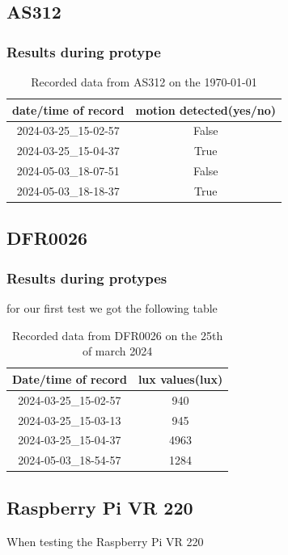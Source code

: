 \subsection{AS312}
\subsubsection{Results during protype}
\begin{table}[h!]
    \centering
    \begin{tabular}{|c|c|}
        \hline
        date/time of record & motion detected(yes/no)\\
        \hline \hline
        2024-03-25_15-02-57&False \\
        2024-03-25_15-04-37&True\\
        2024-05-03_18-07-51&False\\
        2024-05-03_18-18-37&True\\
        \hline
    \end{tabular}
    \caption{Recorded data from  AS312 on the \today}
    \label{Recorded data from  AS312 on the \today}
\end{table}
\subsection{DFR0026}
\subsubsection{Results during protypes}
for our first test we got  the following  table 
\begin{table}[h!]
    \centering
    \begin{tabular}{|c|c|}
        \hline
        Date/time of record & lux values(lux)\\
        \hline \hline
        2024-03-25_15-02-57&940\\
        2024-03-25_15-03-13&945\\
        2024-03-25_15-04-37&4963\\
        2024-05-03_18-54-57&1284\\
        \hline
    \end{tabular}
    \caption{Recorded data from DFR0026 on the 25th of march 2024}
    \label{Recorded data from DFR0026 on the 25th of march 2024}
\end{table}
\newpage
\subsection{Raspberry Pi VR 220}
When testing  the Raspberry Pi VR 220
